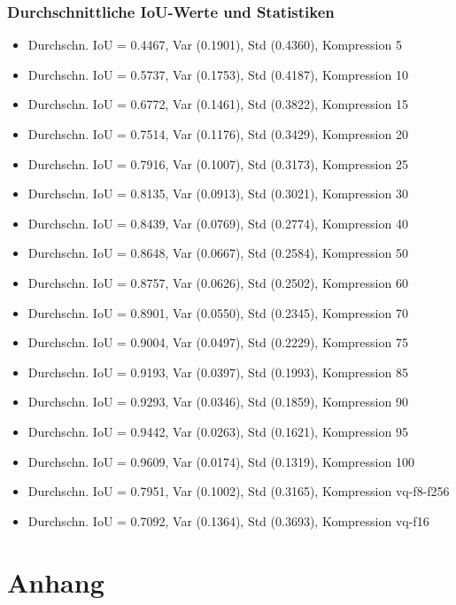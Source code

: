 \newpage
    \section*{Durchschnittliche IoU-Werte und Statistiken}

\begin{itemize}
    \item Durchschn. IoU = 0.4467, Var (0.1901), Std (0.4360), Kompression 5
    \item Durchschn.  IoU = 0.5737, Var (0.1753), Std (0.4187), Kompression 10
    \item Durchschn.  IoU = 0.6772, Var (0.1461), Std (0.3822), Kompression 15
    \item Durchschn.  IoU = 0.7514, Var (0.1176), Std (0.3429), Kompression 20
    \item Durchschn.  IoU = 0.7916, Var (0.1007), Std (0.3173), Kompression 25
    \item Durchschn.  IoU = 0.8135, Var (0.0913), Std (0.3021), Kompression 30
    \item Durchschn.  IoU = 0.8439, Var (0.0769), Std (0.2774), Kompression 40
    \item Durchschn.  IoU = 0.8648, Var (0.0667), Std (0.2584), Kompression 50
    \item Durchschn.  IoU = 0.8757, Var (0.0626), Std (0.2502), Kompression 60
    \item Durchschn.  IoU = 0.8901, Var (0.0550), Std (0.2345), Kompression 70
    \item Durchschn.  IoU = 0.9004, Var (0.0497), Std (0.2229), Kompression 75
    \item Durchschn.  IoU = 0.9193, Var (0.0397), Std (0.1993), Kompression 85
    \item Durchschn.  IoU = 0.9293, Var (0.0346), Std (0.1859), Kompression 90
    \item Durchschn.  IoU = 0.9442, Var (0.0263), Std (0.1621), Kompression 95
    \item Durchschn.  IoU = 0.9609, Var (0.0174), Std (0.1319), Kompression 100
    \item Durchschn.  IoU = 0.7951, Var (0.1002), Std (0.3165), Kompression vq-f8-f256
    \item Durchschn.  IoU = 0.7092, Var (0.1364), Std (0.3693), Kompression vq-f16
\end{itemize}

\part{Anhang}
